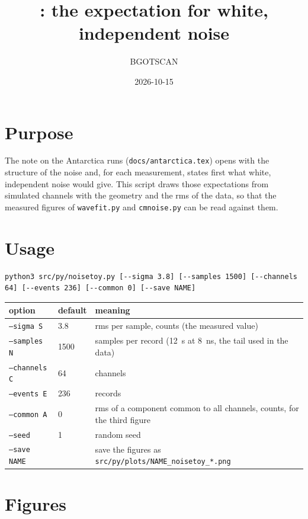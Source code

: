 \documentclass[11pt]{article}
\title{\code{noisetoy.py}: the expectation for white, independent noise}
\author{BGOTSCAN}
\date{2026-10-15}
\newcommand{\code}[1]{\texttt{#1}}
\newcommand{\us}{\textmu s}
\begin{document}
\maketitle

\section{Purpose}

The note on the Antarctica runs (\code{docs/antarctica.tex}) opens with
the structure of the noise and, for each measurement, states first what
white, independent noise would give. This script draws those
expectations from simulated channels with the geometry and the rms of
the data, so that the measured figures of \code{wavefit.py} and
\code{cmnoise.py} can be read against them.

\section{Usage}

\begin{lstlisting}
python3 src/py/noisetoy.py [--sigma 3.8] [--samples 1500] [--channels 64] [--events 236] [--common 0] [--save NAME]
\end{lstlisting}

\begin{center}
\begin{tabular}{l l p{80mm}}
\toprule
option & default & meaning \\
\midrule
\code{--sigma S} & 3.8 & rms per sample, counts (the measured value) \\
\code{--samples N} & 1500 & samples per record (12~\us{} at 8~ns, the tail used in the data) \\
\code{--channels C} & 64 & channels \\
\code{--events E} & 236 & records \\
\code{--common A} & 0 & rms of a component common to all channels, counts, for the third figure \\
\code{--seed} & 1 & random seed \\
\code{--save NAME} & & save the figures as \code{src/py/plots/NAME\_noisetoy\_*.png} \\
\bottomrule
\end{tabular}
\end{center}

\section{Figures}
\end{document}
